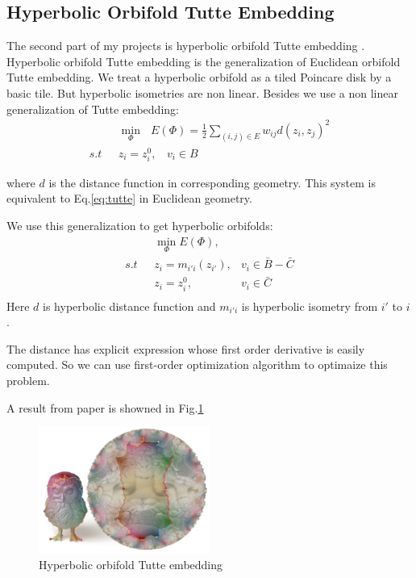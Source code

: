 \documentclass[fleqn,10pt]{wlscirep}
\begin{document}
\subsection{Hyperbolic Orbifold Tutte Embedding}
The second part of my projects is hyperbolic orbifold Tutte embedding \cite{Aigerman:2016:HOT:2980179.2982412}. 
Hyperbolic orbifold Tutte embedding  is the generalization of Euclidean orbifold Tutte embedding. We treat a hyperbolic orbifold as a tiled Poincare disk by a basic tile. But hyperbolic isometries are non linear. Besides we use a non linear generalization of Tutte embedding:
\begin{equation}
\begin{split}
&\min_{\Phi}\ \ \   E(\Phi) = \frac{1}{2}\sum_{(i,j)\in E} w_{ij} d(z_i, z_j)^2 \\
s.t \ \ \   &z_i = z_i^0, \ \ \ \ v_i \in B
\end{split}
\end{equation}

where $d$ is the distance function in corresponding geometry. This system is equivalent to Eq.\ref{eq:tutte} in Euclidean geometry.

We use this generalization to get hyperbolic orbifolds:
\begin{equation}
\begin{split}
&\min_{\Phi} E(\Phi),&\\
s.t \ \ \ &z_i = m_{i'i}(z_{i'}), &v_i \in \bar{B} - \bar{C}\\
 &z_i = z_i^0, &v_i \in \bar{C}\\
\end{split}
\end{equation}
Here $d$ is hyperbolic distance function and $m_{i'i}$ is hyperbolic isometry from $i'$ to $i$.

The distance has explicit expression whose first order derivative is easily computed. So we can use first-order optimization algorithm to optimaize this problem.

A result from paper is showned in Fig.\ref{fig:hyper-orbifold} 

\begin{figure}
\centering
\includegraphics[width = 0.5\textwidth]{images/hyperbolic}
\caption{Hyperbolic orbifold Tutte embedding}
\label{fig:hyper-orbifold}
\end{figure}
\end{document}
